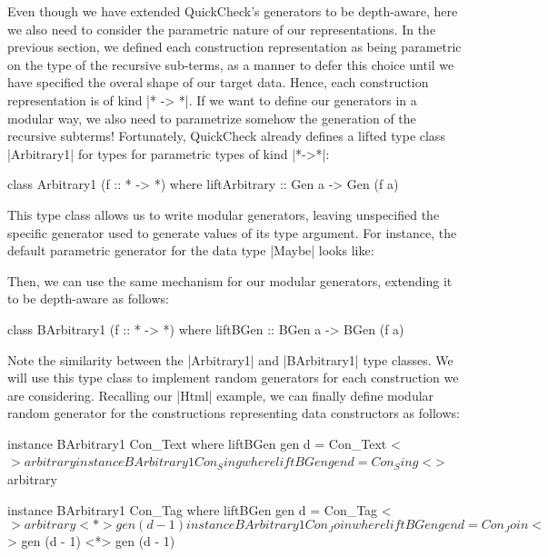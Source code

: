 Even though we have extended QuickCheck's generators to be depth-aware, here we
also need to consider the parametric nature of our representations.
%
In the previous section, we defined each construction representation as being
parametric on the type of the recursive sub-terms, as a manner to defer this
choice until we have specified the overal shape of our target data.
%
Hence, each construction representation is of kind |* -> *|.
%
If we want to define our generators in a modular way, we also need to
parametrize somehow the generation of the recursive subterms!
%
Fortunately, QuickCheck already defines a lifted type class |Arbitrary1| for
types for parametric types of kind |*->*|:

\begin{code}
class Arbitrary1 (f :: * -> *) where
  liftArbitrary :: Gen a -> Gen (f a)
\end{code}

This type class allows us to write modular generators, leaving unspecified the
specific generator used to generate values of its type argument.
%
For instance, the default parametric generator for the data type |Maybe| looks
like:


Then, we can use the same mechanism for our modular generators, extending it to
be depth-aware as follows:

\begin{code}
class BArbitrary1 (f :: * -> *) where
  liftBGen :: BGen a -> BGen (f a)
\end{code}

Note the similarity between the |Arbitrary1| and |BArbitrary1| type classes.
%
We will use this type class to implement random generators for each construction
we are considering.
%
Recalling our |Html| example, we can finally define modular random generator for
the constructions representing data constructors as follows:

\begin{code}
instance BArbitrary1 Con_Text where
  liftBGen gen d = Con_Text <$> arbitrary

instance BArbitrary1 Con_Sing where
  liftBGen gen d = Con_Sing <$> arbitrary

instance BArbitrary1 Con_Tag where
  liftBGen gen d = Con_Tag <$> arbitrary <*> gen (d - 1)

instance BArbitrary1 Con_Join where
  liftBGen gen d = Con_Join <$> gen (d - 1) <*> gen (d - 1)
\end{code} %

